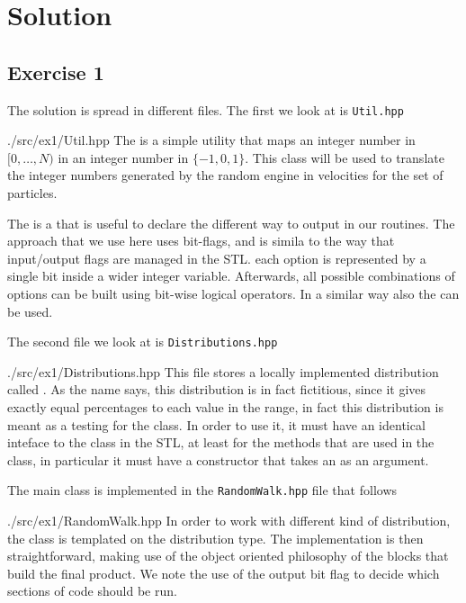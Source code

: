 \section*{Solution}

\subsection*{Exercise 1}

The solution is spread in different files. The first we look at is
\texttt{Util.hpp}
%
\lstset{basicstyle=\scriptsize\sf}

    {./src/ex1/Util.hpp}
\lstset{basicstyle=\sf}
%
The  is a simple utility that maps an integer number in
$[0,\ldots,N)$ in an integer number in $\{-1,0,1\}$. This class will be used to
translate the integer numbers generated by the random engine in	velocities for
the set of particles.

The  is a  that is useful to declare the different way
to output in our routines. The approach that we use here uses bit-flags, and is
simila to the way that input/output flags are managed in the STL. each option is
represented by a single bit inside a wider integer variable. Afterwards, all
possible combinations of options can be built using bit-wise logical operators.
In a similar way also the  can be used.

The second file we look at is \texttt{Distributions.hpp}
%
\lstset{basicstyle=\scriptsize\sf}

    {./src/ex1/Distributions.hpp}
\lstset{basicstyle=\sf}
%
This file stores a locally implemented distribution called
. As the name says, this distribution is in fact
fictitious, since it gives exactly equal percentages to each value in the range,
in fact this distribution is meant as a testing for the  class.
In order to use it, it must have an identical inteface to the
 class in the STL, at least for the methods that are
used in the  class, in particular it must have a constructor
that takes an  as an argument. 

The main class  is implemented in the \texttt{RandomWalk.hpp} 
file that follows
%
\lstset{basicstyle=\scriptsize\sf}

    {./src/ex1/RandomWalk.hpp}
\lstset{basicstyle=\sf}
%
In order to work with different kind of distribution, the class is templated on
the distribution type. The implementation is then straightforward, making use of
the object oriented philosophy of the blocks that build the final product. We
note the use of the output bit flag to decide which sections of code should be
run.

